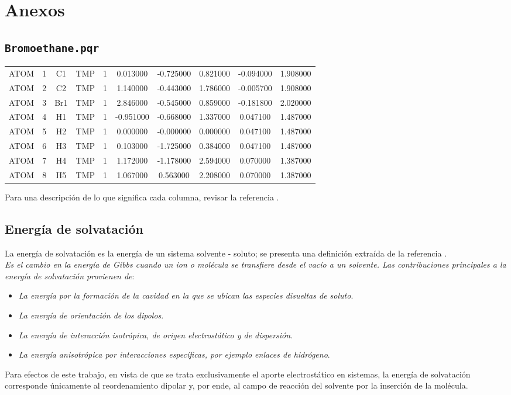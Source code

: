 \documentclass[12pt, oneside, numbers, spanish]{ezthesis}
\numberwithin{equation}{section}
\begin{document}
\pagebreak
{}
\section*{Anexos}
\subsection*{\texttt{Bromoethane.pqr}}
\begin{table}[H]
	\centering
	\begin{tabular}{cccccccccc}
		ATOM & 1 & C1 & TMP & 1 & 0.013000 & -0.725000 & 0.821000 & -0.094000 & 1.908000\\
		ATOM & 2 & C2 & TMP & 1 & 1.140000 & -0.443000 & 1.786000 & -0.005700 & 1.908000\\
		ATOM & 3 & Br1 & TMP & 1 & 2.846000 & -0.545000 & 0.859000 & -0.181800 & 2.020000\\
		ATOM & 4 & H1 & TMP & 1 & -0.951000 & -0.668000 & 1.337000 & 0.047100 & 1.487000\\
		ATOM & 5 & H2 & TMP & 1 & 0.000000 & -0.000000 & 0.000000 & 0.047100 & 1.487000\\
		ATOM & 6 & H3 & TMP & 1 & 0.103000 & -1.725000 & 0.384000 & 0.047100 & 1.487000\\
		ATOM & 7 & H4 & TMP & 1 & 1.172000 & -1.178000 & 2.594000 & 0.070000 & 1.387000\\
		ATOM & 8 & H5 & TMP & 1 & 1.067000 & 0.563000 & 2.208000 & 0.070000 & 1.387000\\
	\end{tabular}
\end{table}
Para una descripción de lo que significa cada columna, revisar la referencia \cite{pdb2pqr_2}.

\subsection*{Energía de solvatación}
La energía de solvatación es la energía de un sistema solvente - soluto; se presenta una definición extraída de la referencia \cite{glossary_of_chem_terms}.\\
\textit{Es el cambio en la energía de Gibbs cuando un ion o molécula se transfiere desde el vacío a un solvente. Las contribuciones principales a la energía de solvatación provienen de}:
\begin{itemize}
	\item \textit{La energía por la formación de la cavidad en la que se ubican las especies disueltas de soluto}.
	\item \textit{La energía de orientación de los dipolos}.
	\item \textit{La energía de interacción isotrópica, de origen electrostático y de dispersión}.
	\item \textit{La energía anisotrópica por interacciones específicas, por ejemplo enlaces de hidrógeno}.
\end{itemize}
Para efectos de este trabajo, en vista de que se trata exclusivamente el aporte electrostático en sistemas, la energía de solvatación corresponde únicamente al reordenamiento dipolar y, por ende, al campo de reacción del solvente por la inserción de la molécula.
\end{document}
